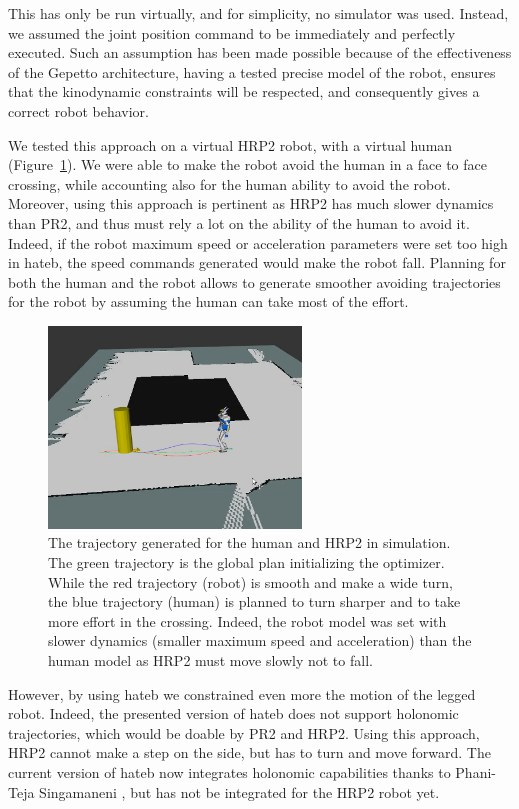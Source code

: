 \documentclass[a4paper,11pt,twoside]{StyleThese}
\begin{document}
This has only be run virtually, and for simplicity, no simulator was used. Instead, we assumed the joint position command to be immediately and perfectly executed. Such an assumption has been made possible because of the effectiveness of the Gepetto architecture, having a tested precise model of the robot, ensures that the kinodynamic constraints will be respected, and consequently gives a correct robot behavior.

We tested this approach on a virtual HRP2 robot, with a virtual human (Figure~\ref{fig:hrp2}). We were able to make the robot avoid the human in a face to face crossing, while accounting also for the human ability to avoid the robot. Moreover, using this approach is pertinent as HRP2 has much slower dynamics than PR2, and thus must rely a lot on the ability of the human to avoid it. Indeed, if the robot maximum speed or acceleration parameters were set too high in \acrshort{hateb}, the speed commands generated would make the robot fall. Planning for both the human and the robot allows to generate smoother avoiding trajectories for the robot by assuming the human can take most of the effort. 

\begin{figure}[hbtp]
\centering
\includegraphics[width=0.6\textwidth]{figures/chapter2/Chap2HRP2.png}
\caption{The trajectory generated for the human and HRP2 in simulation. The green trajectory is the global plan initializing the optimizer. While the red trajectory (robot) is smooth and make a wide turn, the blue trajectory (human) is planned to turn sharper and to take more effort in the crossing. Indeed, the robot model was set with slower dynamics (smaller maximum speed and acceleration) than the human model as HRP2 must move slowly not to fall.}
\label{fig:hrp2}
\end{figure}

However, by using \acrshort{hateb} we constrained even more the motion of the legged robot. Indeed, the presented version of \acrshort{hateb} does not support holonomic trajectories, which would be doable by PR2 and HRP2. Using this approach, HRP2 cannot make a step on the side, but has to turn and move forward. The current version of \acrshort{hateb} now integrates holonomic capabilities thanks to Phani-Teja Singamaneni \cite{singamaneni2020hateb}, but has not be integrated for the HRP2 robot yet.	
\end{document}
